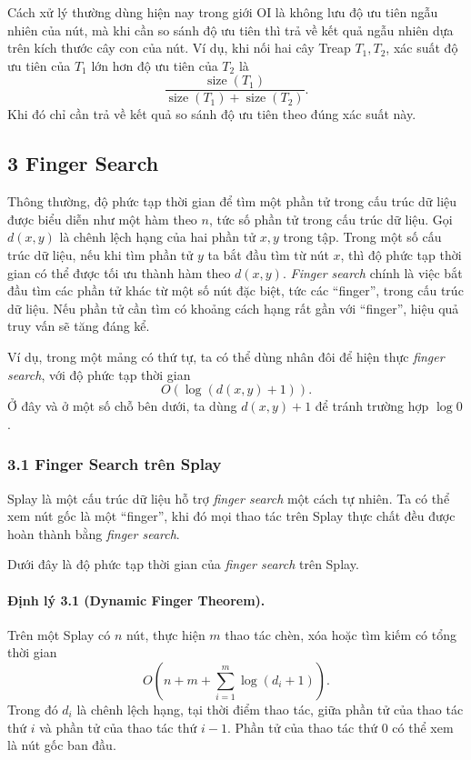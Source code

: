 \documentclass[11pt]{article}
\begin{document}
Cách xử lý thường dùng hiện nay trong giới OI là không lưu độ ưu tiên ngẫu
nhiên của nút, mà khi cần so sánh độ ưu tiên thì trả về kết quả ngẫu nhiên dựa
trên kích thước cây con của nút. Ví dụ, khi nối hai cây Treap \(T_1,T_2\), xác
suất độ ưu tiên của \(T_1\) lớn hơn độ ưu tiên của \(T_2\) là
\[
  \frac{\operatorname{size}(T_1)}
       {\operatorname{size}(T_1)+\operatorname{size}(T_2)}.
\]
Khi đó chỉ cần trả về kết quả so sánh độ ưu tiên theo đúng xác suất này.

\subsection*{3 Finger Search}

Thông thường, độ phức tạp thời gian để tìm một phần tử trong cấu trúc dữ liệu
được biểu diễn như một hàm theo \(n\), tức số phần tử trong cấu trúc dữ liệu.
Gọi \(d(x,y)\) là chênh lệch hạng của hai phần tử \(x,y\) trong tập. Trong một
số cấu trúc dữ liệu, nếu khi tìm phần tử \(y\) ta bắt đầu tìm từ nút \(x\), thì
độ phức tạp thời gian có thể được tối ưu thành hàm theo \(d(x,y)\). \emph{Finger
search} chính là việc bắt đầu tìm các phần tử khác từ một số nút đặc biệt,
tức các ``finger'', trong cấu trúc dữ liệu. Nếu phần tử cần tìm có khoảng cách
hạng rất gần với ``finger'', hiệu quả truy vấn sẽ tăng đáng kể.

Ví dụ, trong một mảng có thứ tự, ta có thể dùng nhân đôi để hiện thực
\emph{finger search}, với độ phức tạp thời gian
\[
  O(\log(d(x,y)+1)).
\]
Ở đây và ở một số chỗ bên dưới, ta dùng \(d(x,y)+1\) để tránh trường hợp
\(\log 0\).

\subsubsection*{3.1 Finger Search trên Splay}

Splay là một cấu trúc dữ liệu hỗ trợ \emph{finger search} một cách tự nhiên. Ta
có thể xem nút gốc là một ``finger'', khi đó mọi thao tác trên Splay thực chất
đều được hoàn thành bằng \emph{finger search}.

Dưới đây là độ phức tạp thời gian của \emph{finger search} trên Splay.

\paragraph{Định lý 3.1 (Dynamic Finger Theorem).}
Trên một Splay có \(n\) nút, thực hiện \(m\) thao tác chèn, xóa hoặc tìm kiếm
có tổng thời gian
\[
  O\left(n+m+\sum_{i=1}^{m}\log(d_i+1)\right).
\]
Trong đó \(d_i\) là chênh lệch hạng, tại thời điểm thao tác, giữa phần tử của
thao tác thứ \(i\) và phần tử của thao tác thứ \(i-1\). Phần tử của thao tác
thứ \(0\) có thể xem là nút gốc ban đầu.
\end{document}
